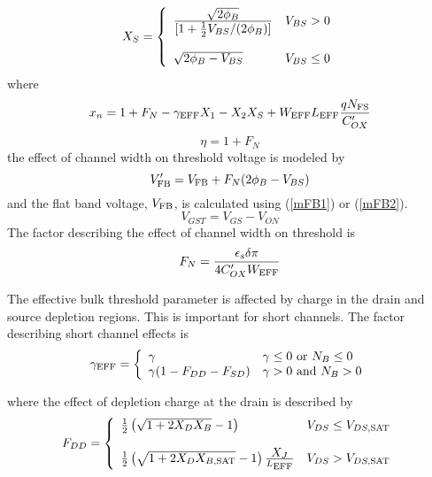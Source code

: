 {\begin{equation}
X_S = \left\{ \begin{array}{ll}
     {{\textstyle\sqrt{\PHI}}\over{\textstyle[1 + \frac{1}{2}V_{BS}/(\PHI)]}}
         & V_{BS} > 0\\
     \\
     \sqrt{\PHI-V_{BS}} & V_{BS} \le 0\\
     \end{array} \right. %
     \label{xs:eqn}
\end{equation}
where
\begin{equation}
x_n      = 1 + F_N -\gamma_{\mbox{\scriptsize EFF}}X_1 -X_2X_S
   + W_{\mbox{\scriptsize EFF}}L_{\mbox{\scriptsize EFF}} {{q N_{\mbox{\scriptsize FS}}} \over {C'_{OX}}}
\end{equation}
\begin{equation}
\eta = 1 + F_N
\end{equation}
the effect of channel width on threshold voltage is modeled by
\begin{equation}
V'_{\mbox{\scriptsize FB}}= V_{\mbox{\scriptsize FB}} + F_N(2\phi_B -V_{BS})
\label{eqn:vdashfb}
\end{equation}
and the flat band voltage, $V_{\mbox{\scriptsize FB}}$, is calculated using
(\ref{mFB1}) or (\ref{mFB2}).
\begin{equation}
V_{GST} = V_{GS} - V_{ON}
\end{equation}
The factor describing the effect of channel width on threshold is
\begin{equation}
F_N={{\textstyle\epsilon_s\delta\pi} \over {\textstyle 4 C'_{OX}
W_{\mbox{\scriptsize EFF}} }}
\end{equation}

The effective bulk threshold parameter is affected by charge in the drain and
source depletion regions.  This is important for short channels.
The factor describing short channel effects is
\begin{equation}
\gamma_{\ms{EFF}} = \left\{ \begin{array}{ll}
     \GAMMA               & \GAMMA \le 0 \mbox{ or } \NSUB \le 0\\
     \GAMMA(1-F_{DD}-F_{SD}) & \GAMMA > 0 \mbox{ and } \NSUB > 0
     \end{array} \right. %
\end{equation}

\clearpage
\noindent
where the effect of depletion charge at the drain is described by
\begin{equation}
F_{DD} = \left\{ \begin{array}{ll}
         \frac{1}{2}\left( \sqrt{1+2X_DX_B}-1\right)
         & V_{DS} \le V_{DS,\ms{SAT}} \\ \\
         \frac{1}{2}\left( \sqrt{1+2X_DX_{B,\ms{SAT}}}-1\right)
         {{\textstyle\XJ}\over{L_{\ms{EFF}}}}
         & V_{DS} > V_{DS,\ms{SAT}} \\
         \end{array} \right. %
\end{equation}

}
